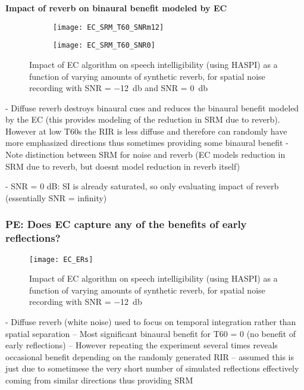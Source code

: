 \textbf{Impact of reverb on binaural benefit modeled by EC}


\begin{figure}[H]
	\centering
	\begin{subfigure}[b]{0.49\textwidth}
		\centering
		\texttt{[image: EC\_SRM\_T60\_SNRm12]}
	\end{subfigure}
	\hfill
	\begin{subfigure}[b]{0.49\textwidth}
		\centering
		\texttt{[image: EC\_SRM\_T60\_SNR0]}
	\end{subfigure}
	\caption{Impact of EC algorithm on speech intelligibility (using HASPI) as a function of varying amounts of synthetic reverb, for spatial noise recording with SNR = \qty{-12}{\decibel} and SNR = \qty{0}{\decibel}}
	\label{fig:EC_SRM_T60}
\end{figure}

- Diffuse reverb destroys binaural cues and reduces the binaural benefit modeled by the EC (this provides modeling of the reduction in SRM due to reverb). However at low T60s the RIR is less diffuse and therefore can randomly have more emphasized directions thus sometimes providing some binaural benefit
- Note distinction between SRM for noise and reverb (EC models reduction in SRM due to reverb, but doesnt model reduction in reverb itself)

- SNR = 0 dB: SI is already saturated, so only evaluating impact of reverb (essentially SNR = infinity)

\subsubsection{PE: Does EC capture any of the benefits of early reflections?}


\begin{figure}[H]
	\texttt{[image: EC\_ERs]}
	\centering
	\caption{Impact of EC algorithm on speech intelligibility (using HASPI) as a function of varying amounts of synthetic reverb, for spatial noise recording with SNR = \qty{-12}{\decibel}  }
	\label{fig:EC_ReverbSNRBoost}
\end{figure}

- Diffuse reverb (white noise) used to focus on temporal integration rather than spatial separation -- Most significant binaural benefit for T60 = 0 (no benefit of early reflections) -- However repeating the experiment several times reveals occasional benefit depending on the randomly generated RIR -- assumed this is just due to sometimese the very short number of simulated reflections effectively coming from similar directions thus providing SRM

